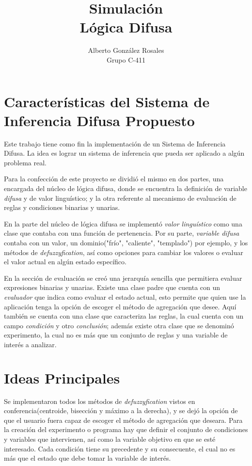 \documentclass[12pt]{article}
\title{\bf\huge Simulaci\'on \\L\'ogica Difusa}
\author{\Large Alberto Gonz\'alez Rosales\\
	\large {Grupo C-411}
	}
\date{}
\begin{document}
\maketitle

\section{Caracter\'isticas del Sistema de Inferencia Difusa Propuesto}

Este trabajo tiene como fin la implementaci\'on de un Sistema de Inferencia Difusa. La idea es lograr un sistema de inferencia que pueda ser aplicado a alg\'un problema real.

Para la confecci\'on de este proyecto se dividi\'o el mismo en dos partes, una encargada del n\'ucleo de l\'ogica difusa, donde se encuentra la definici\'on de variable \emph{difusa} y de valor lingu\'istico; y la otra referente al mecanismo de evaluaci\'on de reglas y condiciones binarias y unarias.

En la parte del n\'ucleo de l\'ogica difusa se implement\'o \emph{valor lingu\'istico} como una clase que contaba con una funci\'on de pertenencia. Por su parte, \emph{variable difusa} contaba con un valor, un dominio("fr\'io", "caliente", "templado") por ejemplo, y los m\'etodos de \emph{defuzzyfication}, as\'i como opciones para cambiar los valores o evaluar el valor actual en alg\'un estado espec\'ifico.

En la secci\'on de evaluaci\'on se cre\'o una jerarqu\'ia sencilla que permitiera evaluar expresiones binarias y unarias. Existe una clase padre que cuenta con un \emph{evaluador} que indica como evaluar el estado actual, esto permite que quien use la aplicaci\'on tenga la opci\'on de escoger el m\'etodo de agregaci\'on que desee. Aqu\'i tambi\'en se cuenta con una clase que caracteriza las reglas, la cual cuenta con un campo \emph{condici\'on} y otro \emph{conclusi\'on}; adem\'as existe otra clase que se denomin\'o experimento, la cual no es m\'as que un conjunto de reglas y una variable de inter\'es a analizar.

\section{Ideas Principales}

Se implementaron todos los m\'etodos de \emph{defuzzyfication} vistos en conferencia(centroide, bisecci\'on y m\'aximo a la derecha), y se dej\'o la opci\'on de que el usuario fuera capaz de escoger el m\'etodo de agregaci\'on que deseara. Para la creaci\'on del experimento o programa hay que definir el conjunto de condiciones y variables que intervienen, as\'i como la variable objetivo en que se est\'e interesado. Cada condici\'on tiene su precedente y su consecuente, el cual no es m\'as que el estado que debe tomar la variable de inter\'es.
\end{document}

